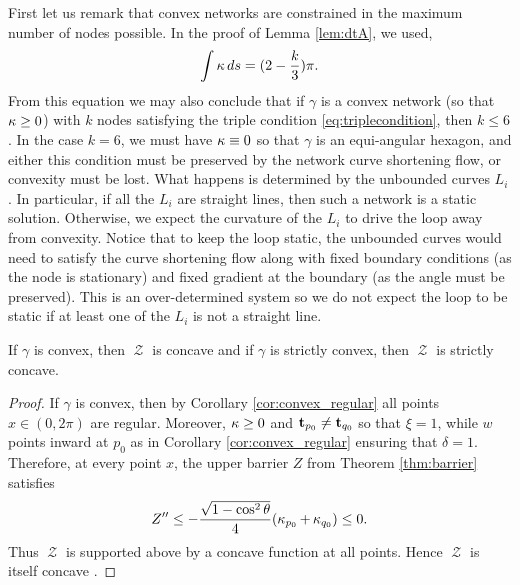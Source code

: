 \documentclass[11pt]{amsart}
\DeclareMathOperator{\chordarcprofile}{\mathcal{Z}}
\begin{document}
First let us remark that convex networks are constrained in the maximum number of nodes possible. In the proof of Lemma \ref{lem:dtA}, we used,
\[
\int \operatorname{\kappa} ds = (2 - \frac{k}{3}) \pi.
\]
From this equation we may also conclude that if \(\gamma\) is a convex network (so that \(\operatorname{\kappa} \geq 0\)) with \(k\) nodes satisfying the triple condition \eqref{eq:triplecondition}, then \(k \leq 6\). In the case \(k = 6\), we must have \(\operatorname{\kappa} \equiv 0\) so that \(\gamma\) is an equi-angular hexagon, and either this condition must be preserved by the network curve shortening flow, or convexity must be lost. What happens is determined by the unbounded curves \(L_i\). In particular, if all the \(L_i\) are straight lines, then such a network is a static solution. Otherwise, we expect the curvature of the \(L_i\) to drive the loop away from convexity. Notice that to keep the loop static, the unbounded curves would need to satisfy the curve shortening flow along with fixed boundary conditions (as the node is stationary) and fixed gradient at the boundary (as the angle must be preserved). This is an over-determined system so we do not expect the loop to be static if at least one of the \(L_i\) is not a straight line.

\begin{lemma}
If $\gamma$ is convex, then $\chordarcprofile$ is concave and if $\gamma$ is strictly convex, then $\chordarcprofile$ is strictly concave.
\end{lemma}

\begin{proof}
If $\gamma$ is convex, then by Corollary \ref{cor:convex_regular} all points $x \in (0, 2\pi)$ are regular. Moreover, $\operatorname{\kappa} \geq 0$ and $\operatorname{\mathbf{t}}_{p_0} \ne \operatorname{\mathbf{t}}_{q_0}$ so that $\xi = 1$, while \(w\) points inward at $p_0$ as in Corollary \ref{cor:convex_regular} ensuring that $\delta = 1$. Therefore, at every point $x$, the upper barrier $Z$ from Theorem \ref{thm:barrier} satisfies
\[
Z'' \leq - \frac{\sqrt{1-\cos^2 \theta}}{4} (\operatorname{\kappa}_{p_0} + \operatorname{\kappa}_{q_0}) \leq 0.
\]
Thus $\chordarcprofile$ is supported above by a concave function at all points. Hence $\chordarcprofile$ is itself concave \cite[Lemma 2.7]{MR1674097}.
\end{proof}
\end{document}
